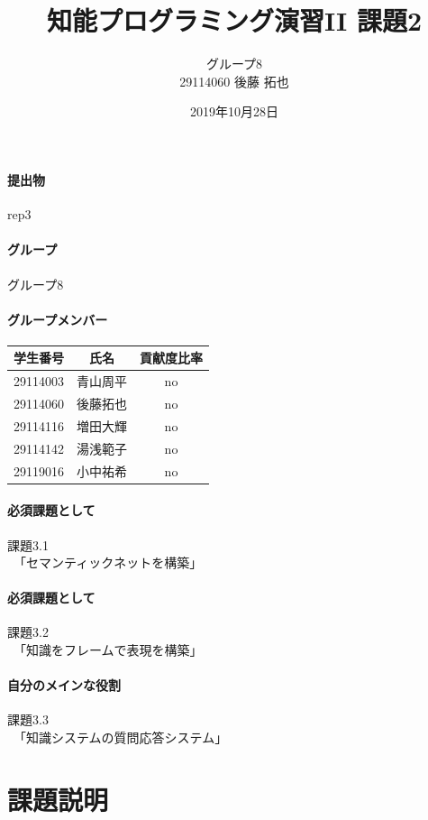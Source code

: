 ﻿\documentclass[uplatex,12pt]{jsarticle}
\title{知能プログラミング演習II 課題2}
\author{グループ8\\
  29114060 後藤 拓也\\
}
\date{2019年10月28日}
\begin{document}
\maketitle

\paragraph{提出物} rep3

\paragraph{グループ} グループ8

\paragraph{グループメンバー}
\begin{center}
\begin{tabular}{|c|c|c|}
  \hline
  学生番号&氏名&貢献度比率\\
  \hline\hline
  29114003&青山周平&no\\
  \hline
  29114060&後藤拓也&no\\
  \hline
  29114116&増田大輝&no\\
  \hline
  29114142&湯浅範子&no\\
  \hline
  29119016&小中祐希&no\\
  \hline
\end{tabular}
\end{center}
\paragraph{必須課題として} 課題3.1
\\　「セマンティックネットを構築」
\paragraph{必須課題として} 課題3.2
\\　「知識をフレームで表現を構築」
\paragraph{自分のメインな役割} 課題3.3
\\　「知識システムの質問応答システム」
\section{課題説明}
\end{document}
